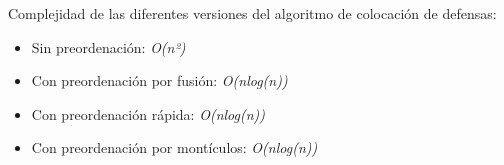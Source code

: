 Complejidad de las diferentes versiones del algoritmo de colocación de defensas:

\begin{itemize}
\item Sin preordenación: \textit{O(n²)}
\item Con preordenación por fusión: \textit{O(nlog(n))}
\item Con preordenación rápida: \textit{O(nlog(n))}
\item Con preordenación por montículos: \textit{O(nlog(n))}
\end{itemize}